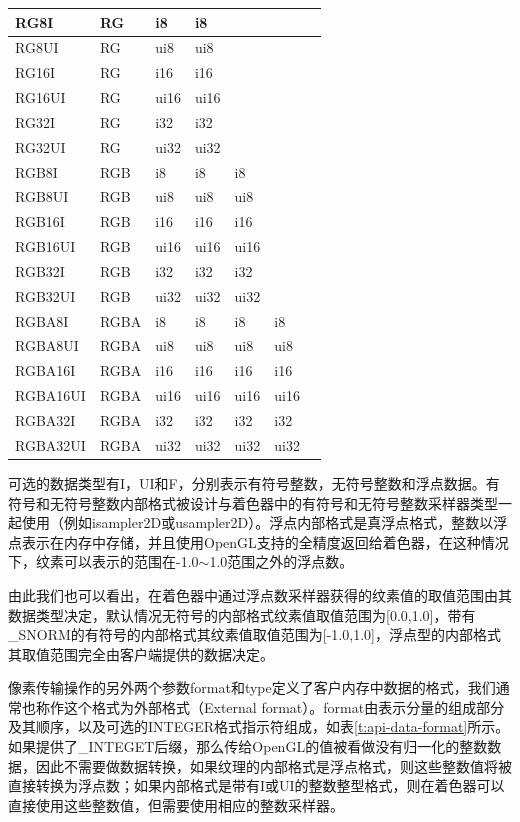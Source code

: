 \begin{longtable}{>{\small}p{}|>{\small}p{}|>{\small}p{}|>{\small}p{}|>{\small}p{}|>{\small}p{}|>{\small}p{}}
  RG8I          & RG & i8 & i8 & & &\\\hline
  RG8UI         & RG & ui8 & ui8 & & &\\\hline
  RG16I         & RG & i16 & i16& & &\\\hline
  RG16UI        & RG & ui16& ui16& & &\\\hline
  RG32I         & RG & i32 & i32 & & &\\\hline
  RG32UI        & RG &  ui32 & ui32& & &\\\hline
  
  RGB8I          & RGB & i8 & i8 & i8 & &\\\hline
  RGB8UI         & RGB & ui8 & ui8 & ui8 & &\\\hline
  RGB16I         & RGB & i16 & i16& i16& &\\\hline
  RGB16UI        & RGB & ui16& ui16& ui16& &\\\hline
  RGB32I         & RGB & i32 & i32 & i32& &\\\hline
  RGB32UI        & RGB & ui32 & ui32& ui32& &\\\hline
  
  RGBA8I          & RGBA & i8 & i8 & i8 & i8 &\\\hline
  RGBA8UI         & RGBA & ui8 & ui8 & ui8 & ui8 &\\\hline
  RGBA16I         & RGBA & i16 & i16& i16& i16 &\\\hline
  RGBA16UI        & RGBA & ui16& ui16& ui16& ui16&\\\hline
  RGBA32I         & RGBA & i32 & i32 & i32& i32&\\\hline
  RGBA32UI        & RGBA & ui32 & ui32& ui32& ui32&\\

 \hline 
\end{longtable}

可选的数据类型有I，UI和F，分别表示有符号整数，无符号整数和浮点数据。有符号和无符号整数内部格式被设计与着色器中的有符号和无符号整数采样器类型一起使用（例如isampler2D或usampler2D）。浮点内部格式是真浮点格式，整数以浮点表示在内存中存储，并且使用OpenGL支持的全精度返回给着色器，在这种情况下，纹素可以表示的范围在-1.0$\sim$1.0范围之外的浮点数。

由此我们也可以看出，在着色器中通过浮点数采样器获得的纹素值的取值范围由其数据类型决定，默认情况无符号的内部格式纹素值取值范围为[0.0,1.0]，带有\_SNORM的有符号的内部格式其纹素值取值范围为[-1.0,1.0]，浮点型的内部格式其取值范围完全由客户端提供的数据决定。

像素传输操作的另外两个参数format和type定义了客户内存中数据的格式，我们通常也称作这个格式为外部格式（External format）。format由表示分量的组成部分及其顺序，以及可选的INTEGER格式指示符组成，如表\ref{t:api-data-format}所示。如果提供了\_INTEGET后缀，那么传给OpenGL的值被看做没有归一化的整数数据，因此不需要做数据转换，如果纹理的内部格式是浮点格式，则这些整数值将被直接转换为浮点数；如果内部格式是带有I或UI的整数整型格式，则在着色器可以直接使用这些整数值，但需要使用相应的整数采样器。


